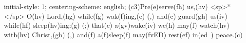 initial-style: 1;
centering-scheme: english;
(c3)Pre(e)serve(fh) us,(hv) <sp>*</sp> O(hv) Lord,(hg) while(fg) wak(f)ing,(e) (,) and(e) guard(gh) us(iv) while(hf) sleep(hv)ing:(g) (;) that(e) a(gv)wake(iv) we(h) may(f) watch(hv) with(hv) Christ,(gh) (,) and(f) a(f)sleep(f) may(fvED) rest(ef) in(ed~) peace.(c)
